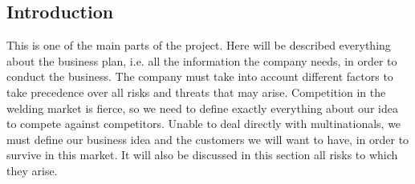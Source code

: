 \subsection{Introduction}
This is one of the main parts of the project. Here will be described everything about the business plan, i.e. all the information the company needs, in order to conduct the business. The company must take into account different factors to take precedence over all risks and threats that may arise. Competition in the welding market is fierce, so we need to define exactly everything about our idea to compete against competitors. Unable to deal directly with multinationals, we must define our business idea and the customers we will want to have, in order to survive in this market. It will also be discussed in this section all risks to which they arise.


